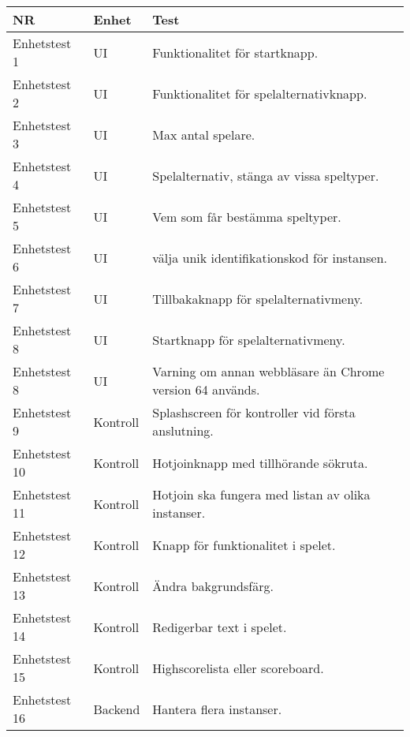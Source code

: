 	\begin{tabular}{| p{2.1cm}| p{2cm} | p{8cm}|}
	
      \hline
      NR&Enhet&Test\\
      \hline
    
		Enhetstest 1&UI&Funktionalitet för startknapp.\\
		\hline
		Enhetstest 2&UI&Funktionalitet för spelalternativknapp.\\
		\hline
		Enhetstest 3&UI&Max antal spelare.\\
		\hline
		Enhetstest 4&UI&Spelalternativ, stänga av vissa speltyper.\\
		\hline
		Enhetstest 5&UI&Vem som får bestämma speltyper.\\
		\hline
		Enhetstest 6&UI&välja unik identifikationskod för instansen.\\
		\hline
		Enhetstest 7&UI&Tillbakaknapp för spelalternativmeny.\\
		\hline
		Enhetstest 8&UI&Startknapp för spelalternativmeny.\\
		\hline
		Enhetstest 8&UI&Varning om annan webbläsare än Chrome version 64 används.\\
		\hline
		Enhetstest 9&Kontroll&Splashscreen för kontroller vid första anslutning.\\
		\hline
		Enhetstest 10&Kontroll&Hotjoinknapp med tillhörande sökruta.\\
		\hline
		Enhetstest 11&Kontroll&Hotjoin ska fungera med listan av olika instanser.\\
		\hline
		Enhetstest 12&Kontroll&Knapp för funktionalitet i spelet.\\
		\hline
		Enhetstest 13&Kontroll&Ändra bakgrundsfärg.\\
		\hline
		Enhetstest 14&Kontroll&Redigerbar text i spelet.\\
		\hline
		Enhetstest 15&Kontroll&Highscorelista eller scoreboard.\\
		\hline
		Enhetstest 16&Backend&Hantera flera instanser.\\
		\hline



   
  \end{tabular}


